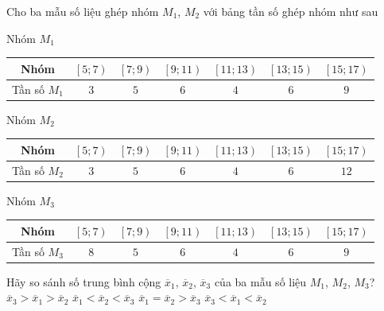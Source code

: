 \begin{ex}%
	Cho ba mẫu số liệu ghép nhóm $M_1$, $M_2$ với bảng tần số ghép nhóm như sau
	\begin{center}
		Nhóm $M_1$
		\begin{tabular}{|c|c|c|c|c|c|c|}
			\hline
			Nhóm & $\left[5;7\right)$ &$\left[7;9\right)$ &$\left[9;11\right)$ &$\left[11;13\right)$ &$\left[13;15\right)$ &$\left[15;17\right)$ \\
			\hline
			Tần số $M_1$ & $3$ & $5$ & $6$ & $4$ & $6$ & $9$ \\
			\hline
		\end{tabular}
	\end{center}
	
	\begin{center}
		Nhóm $M_2$
		\begin{tabular}{|c|c|c|c|c|c|c|}
			\hline
			Nhóm & $\left[5;7\right)$ &$\left[7;9\right)$ &$\left[9;11\right)$ &$\left[11;13\right)$ &$\left[13;15\right)$ &$\left[15;17\right)$ \\
			\hline
			Tần số $M_2$ & $3$ & $5$ & $6$ & $4$ & $6$ & $12$ \\
			\hline
		\end{tabular}
	\end{center}
	
	\begin{center}
		Nhóm $M_3$
		\begin{tabular}{|c|c|c|c|c|c|c|}
			\hline
			Nhóm & $\left[5;7\right)$ &$\left[7;9\right)$ &$\left[9;11\right)$ &$\left[11;13\right)$ &$\left[13;15\right)$ &$\left[15;17\right)$ \\
			\hline
			Tần số $M_3$ & $8$ & $5$ & $6$ & $4$ & $6$ & $9$ \\
			\hline
		\end{tabular}
	\end{center}
	Hãy so sánh số trung bình cộng $\overline{x}_1$, $\overline{x}_2$, $\overline{x}_3$ của ba mẫu số liệu $M_1$, $M_2$, $M_3$?
	\choice
	{$\overline{x}_3 > \overline{x}_1 > \overline{x}_2$}
	{$\overline{x}_1 < \overline{x}_2 < \overline{x}_3$}
	{$\overline{x}_1 = \overline{x}_2 > \overline{x}_3$}
	{\True $\overline{x}_3 < \overline{x}_1 < \overline{x}_2$}
\end{ex}
